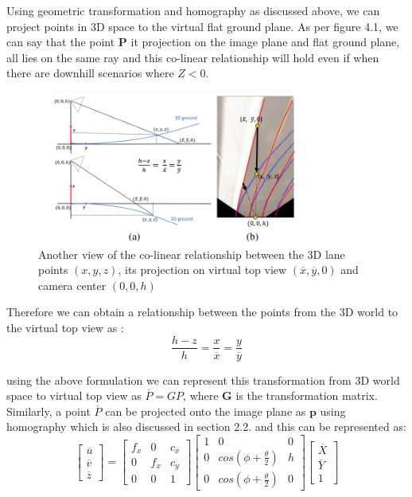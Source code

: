     Using geometric transformation and homography as discussed above, we can project points in 3D space to the virtual flat ground plane. As per figure 4.1, we can say that the point \textbf{P} it projection on the image plane and flat ground plane, all lies on the same ray and this co-linear relationship will hold even if when there are downhill scenarios where $Z<0$. 
    
      \begin{figure}[h]
    \centering
    \includegraphics[width=9cm, height=5cm]{images/collinear_3dlane.png}
    \caption{Another view  of the \cite{guo2020gen} co-linear relationship between the 3D lane points $(x,y,z)$, its projection on virtual top view $(\overline{x}, \overline{y},0)$ and camera center $(0,0,h)$ }
    \end{figure}

    Therefore we can obtain a relationship between the points from the 3D world to the virtual top view as \cite{guo2020gen}:
    \begin{equation}
        \frac{h-z}{h} =\frac{x}{\overline{x}}=\frac{y}{\overline{y}} 
    \end{equation}
    
    using the above formulation we can represent this transformation from 3D world space to virtual top view as \textbf{$\overline{P} = GP$}, where \textbf{G} is the transformation matrix. Similarly, a point \textbf{$\overline{P}$} can be projected onto the image plane as $\textbf{p}$ using homography which is also discussed in section 2.2. and this can be represented as: 
    \begin{equation}
       \begin{bmatrix}\overline{u}  \\\overline{v} \\ \overline{z}\end{bmatrix} = \begin{bmatrix} f_{x} & 0& c_{x}  \\0 &f_{x} & c_{y} \\ 0 & 0 & 1     \end{bmatrix}\begin{bmatrix} 1 & 0& 0  \\0 &cos(\phi+ \frac{\theta}{2}) & h \\ 0 &cos(\phi+ \frac{\theta}{2}) & 0     \end{bmatrix}\begin{bmatrix}\overline{X}  \\\overline{Y} \\ 1\end{bmatrix}
    \end{equation}

